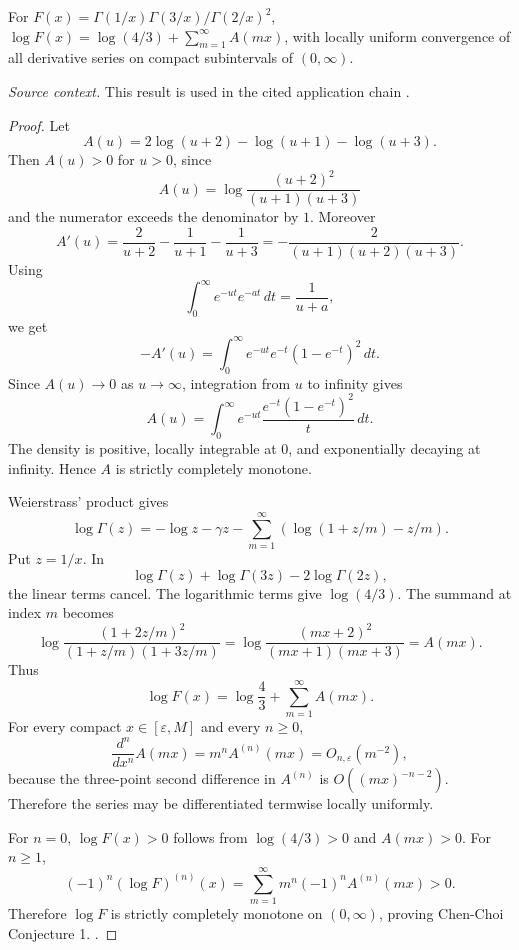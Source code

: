 \begin{proposition}
\label{res:chen-choi-gurland-euler-sum-normal-form}
For \(F(x)=\Gamma(1/x)\Gamma(3/x)/\Gamma(2/x)^2\), \(\log F(x)=\log(4/3)+\sum_{m=1}^{\infty}A(mx)\), with locally uniform convergence of all derivative series on compact subintervals of \((0,\infty)\).

\emph{Source context.} This result is used in the cited application chain \cite{chen-choi-gurland}.
\end{proposition}
\begin{proof}
Let
\[
A(u)=2\log(u+2)-\log(u+1)-\log(u+3).
\]
Then \(A(u)>0\) for \(u>0\), since
\[
A(u)=\log\frac{(u+2)^2}{(u+1)(u+3)}
\]
and the numerator exceeds the denominator by \(1\).
Moreover
\[
A'(u)=\frac2{u+2}-\frac1{u+1}-\frac1{u+3}
=-\frac{2}{(u+1)(u+2)(u+3)}.
\]
Using
\[
\int_0^\infty e^{-ut}e^{-at}\,dt=\frac1{u+a},
\]
we get
\[
-A'(u)=\int_0^\infty e^{-ut}e^{-t}(1-e^{-t})^2\,dt.
\]
Since \(A(u)\to0\) as \(u\to\infty\), integration from \(u\) to infinity gives
\[
A(u)=\int_0^\infty e^{-ut}\frac{e^{-t}(1-e^{-t})^2}{t}\,dt.
\]
The density is positive, locally integrable at \(0\), and exponentially decaying at infinity. Hence \(A\) is strictly completely monotone.

Weierstrass' product gives
\[
\log\Gamma(z)=-\log z-\gamma z-
\sum_{m=1}^{\infty}\left(\log(1+z/m)-z/m\right).
\]
Put \(z=1/x\). In
\[
\log\Gamma(z)+\log\Gamma(3z)-2\log\Gamma(2z),
\]
the linear terms cancel. The logarithmic terms give \(\log(4/3)\). The summand at index \(m\) becomes
\[
\log\frac{(1+2z/m)^2}{(1+z/m)(1+3z/m)}
=\log\frac{(mx+2)^2}{(mx+1)(mx+3)}=A(mx).
\]
Thus
\[
\log F(x)=\log\frac43+\sum_{m=1}^{\infty}A(mx).
\]
For every compact \(x\in[\varepsilon,M]\) and every \(n\ge0\),
\[
\frac{d^n}{dx^n}A(mx)=m^nA^{(n)}(mx)=O_{n,\varepsilon}(m^{-2}),
\]
because the three-point second difference in \(A^{(n)}\) is \(O((mx)^{-n-2})\). Therefore the series may be differentiated termwise locally uniformly.

For \(n=0\), \(\log F(x)>0\) follows from \(\log(4/3)>0\) and \(A(mx)>0\). For \(n\ge1\),
\[
(-1)^n(\log F)^{(n)}(x)=
\sum_{m=1}^{\infty}m^n(-1)^nA^{(n)}(mx)>0.
\]
Therefore \(\log F\) is strictly completely monotone on \((0,\infty)\), proving Chen-Choi Conjecture 1. \cite{chen-choi-gurland}.
\end{proof}

